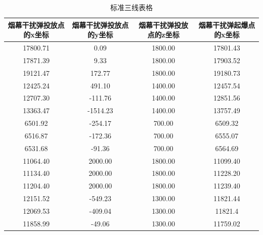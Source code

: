 \documentclass[../main.tex]{subfiles}
\begin{document}
\begin{table}[H]
\caption{标准三线表格}
\label{tab:031} 
\centering
\begin{small}
\begin{tabular}{cccc}
\toprule[1.5pt]
烟幕干扰弹投放点的x坐标& 烟幕干扰弹投放点的y坐标    &烟幕干扰弹投放点的z坐标 & 烟幕干扰弹起爆点的x坐标\\
\midrule[1pt]
    17800.71 & 0.09    & 1800.00 & 17801.43 \\
    17871.39 & 9.33    & 1800.00 & 17903.52 \\
    19121.47 & 172.77  & 1800.00 & 19180.73 \\
    12425.24 & 491.10  & 1400.00 & 12457.54 \\
    12707.30 & -111.76 & 1400.00 & 12851.56 \\
    13363.47 & -1514.23& 1400.00 & 13757.49 \\
    6501.92  & -254.17 & 700.00  & 6509.32 \\
    6516.87  & -172.36 & 700.00  & 6555.07 \\
    6531.68  & -91.36  & 700.00  & 6564.69 \\
    11064.40 & 2000.00 & 1800.00 & 11099.40 \\
    11134.40 & 2000.00 & 1800.00 & 11228.20 \\
    11204.40 & 2000.00 & 1800.00 & 11239.40 \\
    12151.52 & -549.23 & 1300.00 & 11821.44 \\
    12069.53 & -409.04 & 1300.00 & 11821.4 \\
    11858.99 & -49.06  & 1300.00 & 11759.02 \\
\bottomrule[1.5pt]
\end{tabular}
\end{small}
\end{table}
\end{document}
